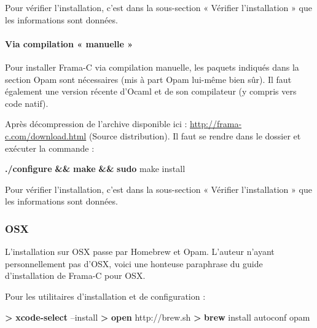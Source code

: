 \documentclass[12pt,francais,]{scrbook}
\newenvironment{Shaded}{}{}
\newcommand{\KeywordTok}[1]{\textcolor[rgb]{0.00,0.44,0.13}{\textbf{{#1}}}}
\newcommand{\NormalTok}[1]{{#1}}
\begin{document}
Pour vérifier l'installation, c'est dans la sous-section « Vérifier
l'installation » que les informations sont données.

\paragraph{Via compilation « manuelle »}\label{via-compilation-manuelle}

Pour installer Frama-C via compilation manuelle, les paquets indiqués
dans la section Opam sont nécessaires (mis à part Opam lui-même bien
sûr). Il faut également une version récente d'Ocaml et de son
compilateur (y compris vers code natif).

Après décompression de l'archive disponible ici :
\url{http://frama-c.com/download.html} (Source distribution). Il faut se
rendre dans le dossier et exécuter la commande :

\begin{footnotesize}\begin{Shaded}
\begin{Highlighting}[]
\KeywordTok{./configure} \KeywordTok{&&} \KeywordTok{make} \KeywordTok{&&} \KeywordTok{sudo} \NormalTok{make install}
\end{Highlighting}
\end{Shaded}\end{footnotesize}

Pour vérifier l'installation, c'est dans la sous-section « Vérifier
l'installation » que les informations sont données.

\subsubsection{OSX}\label{osx}

L'installation sur OSX passe par Homebrew et Opam. L'auteur n'ayant
personnellement pas d'OSX, voici une honteuse paraphrase du guide
d'installation de Frama-C pour OSX.

Pour les utilitaires d'installation et de configuration :

\begin{footnotesize}\begin{Shaded}
\begin{Highlighting}[]
\KeywordTok{>} \KeywordTok{xcode-select} \NormalTok{--install }
\KeywordTok{>} \KeywordTok{open} \NormalTok{http://brew.sh}
\KeywordTok{>} \KeywordTok{brew} \NormalTok{install autoconf opam }
\end{Highlighting}
\end{Shaded}\end{footnotesize}
\end{document}
